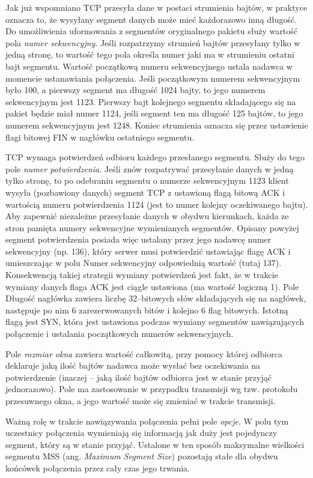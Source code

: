 Jak już wspomniano TCP przesyła dane w postaci strumienia bajtów, w praktyce oznacza to, że wysyłany 
segment danych może mieć każdorazowo inną  długość. Do umożliwienia uformowania z segmentów oryginalnego pakietu 
służy wartość pola \emph{numer sekwencyjny}. Jeśli rozpatrzymy strumień bajtów przesyłany tylko w jedną stronę, to 
wartość tego pola określa  numer jaki ma w strumieniu ostatni bajt segmentu. Wartość początkową numeru 
sekwencyjnego ustala nadawca w momencie ustanawiania połączenia. Jeśli początkowym numerem sekwencyjnym było 
100, a pierwszy segment ma długość 1024 bajty, to jego numerem sekwencyjnym jest 1123. Pierwszy bajt kolejnego 
segmentu składającego się na pakiet będzie miał numer 1124, jeśli segment ten ma długość 125 bajtów, to jego 
numerem sekwencyjnym jest 1248. Koniec strumienia oznacza się przez ustawienie flagi bitowej FIN w nagłówku 
ostatniego segmentu.

TCP wymaga potwierdzeń odbioru każdego przesłanego segmentu. Służy do tego pole \emph{numer potwierdzenia}. Jeśli 
znów rozpatrywać przesyłanie danych w jedną tylko stronę, to po odebraniu segmentu o numerze sekwencyjnym 1123 
klient wysyła (pozbawiony danych) segment TCP z ustawioną flagą bitową ACK i wartością numeru potwierdzenia 1124 
(jest to numer kolejny oczekiwanego bajtu). Aby zapewnić niezależne przesyłanie danych w obydwu kierunkach, 
każda ze stron pamięta numery sekwencyjne wymienianych segmentów. Opisany powyżej segment potwierdzenia posiada 
więc ustalany przez jego nadawcę numer sekwencyjny (np. 136), który serwer musi potwierdzić ustawiając flagę ACK 
i umieszczając w polu Numer sekwencyjny odpowiednią wartość (tutaj 137). Konsekwencją takiej strategii wymiany 
potwierdzeń jest fakt, że w trakcie wymiany danych flaga ACK jest ciągle ustawiona (ma wartość logiczną 1).
Pole Długość nagłówka zawiera liczbę 32--bitowych słów składających się na nagłówek, następuje po nim 6 
zarezerwowanych bitów i kolejno 6 flag bitowych. Istotną flagą jest SYN, która jest ustawiona podczas wymiany 
segmentów nawiązujących połączenie i ustalania początkowych numerów sekwencyjnych. 

Pole \emph{rozmiar okna} zawiera wartość całkowitą, przy pomocy której odbiorca deklaruje jaką ilość bajtów 
nadawca może wysłać bez oczekiwania na potwierdzenie (inaczej -- jaką ilość bajtów odbiorca jest w stanie przyjąć 
jednorazowo). Pole ma zastosowanie w przypadku transmisji wg tzw. protokołu przesuwnego okna, a jego wartość 
może się zmieniać w trakcie  transmisji.

Ważną rolę w trakcie nawiązywania połączenia pełni pole \emph{opcje}. W polu tym uczestnicy połączenia wymieniają 
się informacją jak duży jest pojedynczy segment, który są w stanie przyjąć. Ustalone w ten sposób maksymalne 
wielkości segmentu MSS (ang. \emph{Maximum Segment Size}) pozostają stałe dla obydwu końcówek połączenia przez cały 
czas jego trwania. 

